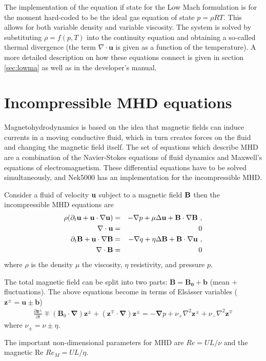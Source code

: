 The implementation of the equation if state for the Low Mach formulation is for the moment hard-coded to be the ideal gas equation of state \(p=\rho R T\). This allows for both variable density and variable viscosity. The system is solved by substituting \(\rho=f(p,T)\) into the continuity equation and obtaining a so-called thermal divergence (the term \(\nabla \cdot \mathbf u\) is given as a function of the temperature).
A more detailed description on how these equations connect is given in section \ref{sec:lowma} as well as in the developer's manual.

\section{Incompressible MHD equations}\label{sec:mhd}
Magnetohydrodynamics is based on the idea that magnetic fields can induce currents in a moving conductive fluid, which in turn creates forces on the fluid and changing the magnetic field itself. The set of equations which describe MHD are a combination of the Navier-Stokes equations of fluid dynamics and Maxwell's equations of electromagnetism. These differential equations have to be solved simultaneously, and Nek5000 has an implementation for the incompressible MHD.

Consider a fluid of velocity \(\mathbf{u}\) subject to a magnetic field \(\mathbf{B}\) then the incompressible MHD equations are
\begin{eqnarray}
 \rho(\partial_{t} \mathbf u + \mathbf u \cdot \nabla \mathbf u) &=& - \nabla p + \mu \Delta \mathbf u + \bB\cdot \nabla \bB \ ,\\ 
 \nabla \cdot \mathbf u & =& 0\\ \nonumber
   \partial_{t} \bB + \mathbf u \cdot \nabla \bB &=& - \nabla q + \eta \Delta \bB + \bB\cdot \nabla \mathbf u \ ,\\ 
    \nabla \cdot \bB & =& 0 \nonumber
\end{eqnarray}
where \(\rho\) is the density \(\mu\) the viscosity, \(\eta\) resistivity, and pressure \(p\).


The total magnetic field can be split into two parts: \( \mathbf{B} = \mathbf{B_0} + \mathbf{b} \) (mean + fluctuations). The above equations become in terms of Els\"asser variables (\(\mathbf{z}^{\pm} =  \mathbf{u} \pm \mathbf{b} \)) 
\begin{eqnarray}
\frac{\partial {\mathbf{z}^{\pm}}}{\partial t}\mp\left(\mathbf {B}_0\cdot{\mathbf \nabla}\right){\mathbf z^{\pm}} + \left({\mathbf z^{\mp}}\cdot{\mathbf \nabla}\right){\mathbf z^{\pm}} = -{\mathbf \nabla}p 
+ \nu_+ \nabla^2 \mathbf{z}^{\pm} + \nu_- \nabla^2 \mathbf{z}^{\mp} 
\end{eqnarray}
where \( \nu_\pm = \nu \pm \eta \).

The important non-dimensional parameters for MHD are \(Re = U L /\nu \) and the magnetic Re \( Re_M = U L /\eta \).
